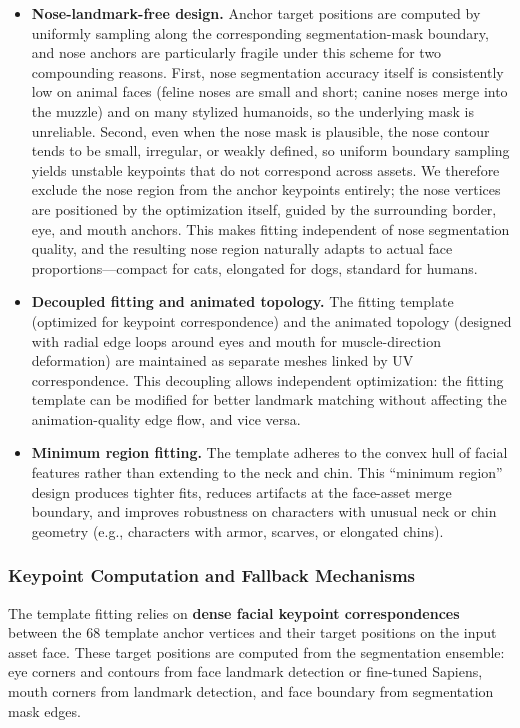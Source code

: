 \documentclass[acmtog,anonymous,review]{acmart}
\begin{document}
\begin{itemize}
  \item \textbf{Nose-landmark-free design.} Anchor target positions are computed by uniformly sampling along the corresponding segmentation-mask boundary, and nose anchors are particularly fragile under this scheme for two compounding reasons. First, nose segmentation accuracy itself is consistently low on animal faces (feline noses are small and short; canine noses merge into the muzzle) and on many stylized humanoids, so the underlying mask is unreliable. Second, even when the nose mask is plausible, the nose contour tends to be small, irregular, or weakly defined, so uniform boundary sampling yields unstable keypoints that do not correspond across assets. We therefore exclude the nose region from the anchor keypoints entirely; the nose vertices are positioned by the optimization itself, guided by the surrounding border, eye, and mouth anchors. This makes fitting independent of nose segmentation quality, and the resulting nose region naturally adapts to actual face proportions---compact for cats, elongated for dogs, standard for humans.
  \item \textbf{Decoupled fitting and animated topology.} The fitting template (optimized for keypoint correspondence) and the animated topology (designed with radial edge loops around eyes and mouth for muscle-direction deformation) are maintained as separate meshes linked by UV correspondence. This decoupling allows independent optimization: the fitting template can be modified for better landmark matching without affecting the animation-quality edge flow, and vice versa.
  \item \textbf{Minimum region fitting.} The template adheres to the convex hull of facial features rather than extending to the neck and chin. This ``minimum region'' design produces tighter fits, reduces artifacts at the face-asset merge boundary, and improves robustness on characters with unusual neck or chin geometry (e.g., characters with armor, scarves, or elongated chins).
\end{itemize}

\subsubsection{Keypoint Computation and Fallback Mechanisms}

The template fitting relies on \textbf{dense facial keypoint correspondences} between the 68 template anchor vertices and their target positions on the input asset face. These target positions are computed from the segmentation ensemble: eye corners and contours from face landmark detection or fine-tuned Sapiens, mouth corners from landmark detection, and face boundary from segmentation mask edges.
\end{document}
